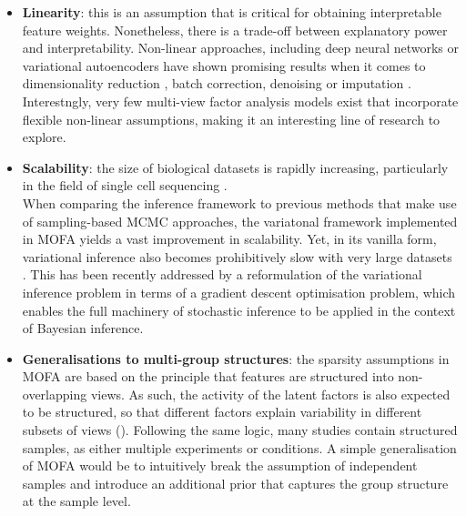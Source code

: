 \begin{itemize}

	\item \textbf{Linearity}: this is an assumption that is critical for obtaining interpretable feature weights. Nonetheless, there is a trade-off between explanatory power and interpretability\cite{Kuhn}. Non-linear approaches, including deep neural networks or variational autoencoders have shown promising results when it comes to dimensionality reduction \cite{Lin2017,Ding2018,Lopez2018}, batch correction\cite{Lopez2018}, denoising \cite{Eraslan2019} or imputation \cite{Lin2016}. Interestngly, very few multi-view factor analysis models exist that incorporate flexible non-linear assumptions, making it an interesting line of research to explore.

	\item \textbf{Scalability}: the size of biological datasets is rapidly increasing, particularly in the field of single cell sequencing \cite{Svensson2018,Cao2019}. \\
	When comparing the inference framework to previous methods that make use of sampling-based MCMC approaches, the variatonal framework implemented in MOFA yields a vast improvement in scalability. Yet, in its vanilla form, variational inference also becomes prohibitively slow with very large datasets \cite{Hoffman2013,Blei2016,Hoffman2014}. This has been recently addressed by a reformulation of the variational inference problem in terms of a gradient descent optimisation problem, which enables the full machinery of stochastic inference to be applied in the context of Bayesian inference.

	\item \textbf{Generalisations to multi-group structures}: the sparsity assumptions in MOFA are based on the principle that features are structured into non-overlapping views. As such, the activity of the latent factors is also expected to be structured, so that different factors explain variability in different subsets of views (). Following the same logic, many studies contain structured samples, as either multiple experiments or conditions. A simple generalisation of MOFA would be to intuitively break the assumption of independent samples and introduce an additional prior that captures the group structure at the sample level.


\end{itemize}
